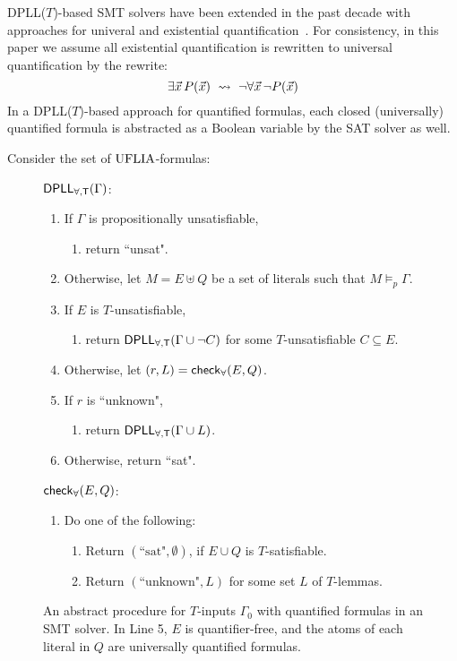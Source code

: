 \documentclass[oribibl]{llncs}
\begin{document}
DPLL($T$)-based SMT solvers have been extended in the past decade with approaches for univeral and existential quantification~\cite{}.
For consistency, in this paper we assume all existential quantification is rewritten to universal quantification by the rewrite:
\[
\exists \vec x\, P( \vec x ) \ \leadsto \  \neg \forall \vec x\, \neg P( \vec x )
\]
In a DPLL($T$)-based approach for quantified formulas, 
each closed (universally) quantified formula is abstracted as a Boolean variable by the SAT solver as well.

\begin{example}
Consider the set of $\mathrm{UFLIA}$-formulas:

\end{example}

\begin{figure}[t]
\begin{framed}
\begin{internallinenumbers}
$\small\mathsf{DPLL_{\forall, T}}( \Gamma )$:
\begin{enumerate}
\item[\ ] If $\Gamma$ is propositionally unsatisfiable,
\begin{enumerate}
\item[\ ] return ``unsat".
\end{enumerate}
\item[\ ] Otherwise, let $M = E \uplus Q$ be a set of literals such that $M \models_p \Gamma$.
\item[\ ] If $E$ is $T$-unsatisfiable,
\begin{enumerate}
\item[\ ] return $\small\mathsf{DPLL_{\forall, T}}( \Gamma \cup \neg C )$ for some $T$-unsatisfiable $C \subseteq E$.
\end{enumerate}
\item[\ ] Otherwise, let $( r, L ) = \small\mathsf{check}_\forall( E, Q )$.
\item[\ ] If $r$ is ``unknown",
\begin{enumerate}
\item[\ ] return $\small\mathsf{DPLL_{\forall, T}}( \Gamma \cup L )$.
\end{enumerate}
\item[\ ] Otherwise, return ``sat".
\end{enumerate}
$\small\mathsf{check}_\forall( E, Q )$:
\begin{enumerate}
\item[\ ] Do one of the following:
\begin{enumerate}
\item[\ ] Return $( \text{``sat"}, \emptyset )$, if $E \cup Q$ is $T$-satisfiable.
\item[\ ] Return $( \text{``unknown"}, L )$ for some set $L$ of $T$-lemmas.
\end{enumerate}
\end{enumerate}
\end{internallinenumbers}
\end{framed}
\vspace{-2ex}
\caption{An abstract procedure for $T$-inputs $\Gamma_0$ with quantified formulas in an SMT solver.
In Line 5, $E$ is quantifier-free, and the atoms of each literal in $Q$ are universally quantified formulas.
\label{fig:smtq}}
\end{figure}
\end{document}
